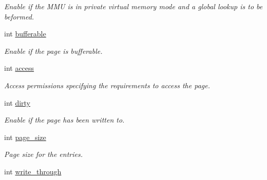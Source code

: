 \begin{CompactItemize}
\begin{CompactList}\small\item\em Enable if the MMU is in private virtual memory mode and a global lookup is to be beformed. \item\end{CompactList}\item 
\hypertarget{structmmu__tlb__t_7eaae47762a66493519ca256a903fa20}{
int \hyperlink{structmmu__tlb__t_7eaae47762a66493519ca256a903fa20}{bufferable}}
\label{structmmu__tlb__t_7eaae47762a66493519ca256a903fa20}

\begin{CompactList}\small\item\em Enable if the page is bufferable. \item\end{CompactList}\item 
\hypertarget{structmmu__tlb__t_f7434b97f74f016a0b7f32d3dd0df6e4}{
int \hyperlink{structmmu__tlb__t_f7434b97f74f016a0b7f32d3dd0df6e4}{access}}
\label{structmmu__tlb__t_f7434b97f74f016a0b7f32d3dd0df6e4}

\begin{CompactList}\small\item\em Access permissions specifying the requirements to access the page. \item\end{CompactList}\item 
\hypertarget{structmmu__tlb__t_318934d32b7f53b5ada76c5f4f6dc500}{
int \hyperlink{structmmu__tlb__t_318934d32b7f53b5ada76c5f4f6dc500}{dirty}}
\label{structmmu__tlb__t_318934d32b7f53b5ada76c5f4f6dc500}

\begin{CompactList}\small\item\em Enable if the page has been written to. \item\end{CompactList}\item 
\hypertarget{structmmu__tlb__t_3e3c7e4b0876ed6622b2d7b2f2b8c5d9}{
int \hyperlink{structmmu__tlb__t_3e3c7e4b0876ed6622b2d7b2f2b8c5d9}{page\_\-size}}
\label{structmmu__tlb__t_3e3c7e4b0876ed6622b2d7b2f2b8c5d9}

\begin{CompactList}\small\item\em Page size for the entries. \item\end{CompactList}\item 
\hypertarget{structmmu__tlb__t_038ab08138d3341a1176414802d68fdb}{
int \hyperlink{structmmu__tlb__t_038ab08138d3341a1176414802d68fdb}{write\_\-through}}
\label{structmmu__tlb__t_038ab08138d3341a1176414802d68fdb}


\end{CompactItemize}
